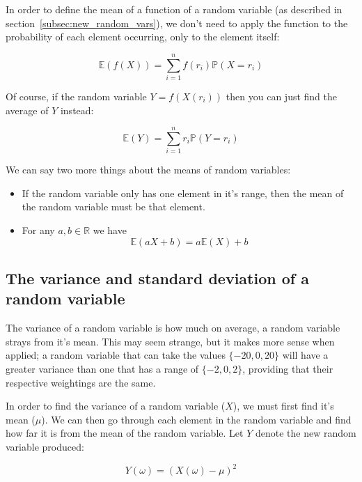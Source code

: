 In order to define the mean of a function of a random variable (as described in
section~\ref{subsec:new_random_vars}), we don't need to apply the function to
the probability of each element occurring, only to the element itself:

\begin{dmath*}
	\mathbb{E}(f(X)) = {\sum\limits_{i=1}^{n} f(r_i) \mathbb{P}(X = r_i)}
\end{dmath*}

Of course, if the random variable $Y = f(X(r_i))$ then you can just find
the average of $Y$ instead:

\begin{dmath*}
	\mathbb{E}(Y) = {\sum\limits_{i=1}^{n} r_i \mathbb{P}(Y = r_i)}
\end{dmath*}

We can say two more things about the means of random variables:

\begin{itemize}
	\item If the random variable only has one element in it's range, then the mean of the random variable must be that element.
	\item For any $a, b \in \mathbb{R}$ we have
	\begin{dmath*}
		\mathbb{E}(aX + b) = a\mathbb{E}(X) + b
	\end{dmath*}
\end{itemize}

\subsection{The variance and standard deviation of a random variable}

The variance of a random variable is how much on average, a random variable
strays from it's mean. This may seem strange, but it makes more sense when
applied; a random variable that can take the values $\{-20, 0, 20\}$ will have
a greater variance than one that has a range of $\{-2, 0, 2\}$, providing that
their respective weightings are the same.

In order to find the variance of a random variable ($X$), we must first find
it's mean ($\mu$). We can then go through each element in the random variable
and find how far it is from the mean of the random variable. Let $Y$ denote
the new random variable produced:

\begin{dmath*}
	Y(\omega) = (X(\omega) - \mu)^2
\end{dmath*}

